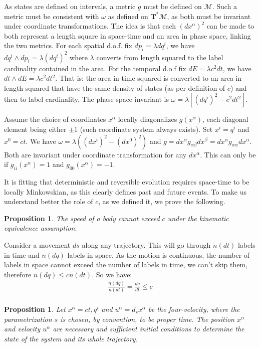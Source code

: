 \documentclass[aps,pra,10pt,twocolumn,floatfix,nofootinbib]{revtex4-1}
\newtheorem{prop}[thm]{Proposition}
\theoremstyle{definition}
\begin{document}
As states are defined on intervals, a metric $g$ must be defined on $\mathcal{M}$. Such a metric must be consistent with $\omega$ as defined on $\mathbf{T}^*\mathcal{M}$, as both must be invariant under coordinate transformations. The idea is that each $(dx^\alpha)^2$ can be made to both represent a length square in space-time and an area in phase space, linking the two metrics. For each spatial d.o.f. fix $dp_i=\lambda dq^i$, we have $dq^i \wedge dp_i = \lambda (dq^i)^2$ where $\lambda$ converts from length squared to the label cardinality contained in the area. For the temporal d.o.f fix $dE = \lambda c^2 dt$, we have $dt \wedge dE = \lambda c^2 dt^2$. That is: the area in time squared is converted to an area in length squared that have the same density of states (as per definition of $c$) and then to label cardinality. The phase space invariant is $\omega = \lambda [(dq^i)^2 - c^2 dt^2]$.

Assume the choice of coordinates $x^\alpha$ locally diagonalizes $g(x^\alpha)$, each diagonal element being either $\pm 1$ (such coordinate system always exists). Set $x^i=q^i$ and $x^0=ct$. We have $\omega = \lambda ((dx^i)^2 - (dx^0)^2)$ and $g=dx^\alpha g_{\alpha \beta} dx^\beta=dx^\alpha g_{\alpha \alpha}dx^\alpha$. Both are invariant under coordinate transformation for any $dx^\alpha$. This can only be if $g_{ii}(x^\alpha)=1$ and $g_{00}(x^\alpha)=-1$.

It is fitting that deterministic and reversible evolution requires space-time to be locally Minkowskian, as this clearly defines past and future events. To make us understand better the role of $c$, as we defined it, we prove the following.

\begin{prop}\label{locallyMinkowski}
The speed of a body cannot exceed $c$ under the kinematic equivalence assumption.
\end{prop}

Consider a movement $ds$ along any trajectory. This will go through $n(dt)$ labels in time and $n(dq)$ labels in space. As the motion is continuous, the number of labels in space cannot exceed the number of labels in time, we can't skip them, therefore $n(dq)\leq c n(dt)$. So we have:
\begin{align*}
\frac{n(dq)}{n(dt)}= \frac{dq}{dt} \leq c \\
\end{align*}

\begin{prop}\label{initialConditions}
Let $x^\alpha={ct, q^i}$ and $u^\alpha = d_s x^\alpha$ be the four-velocity, where the parametrization $s$ is chosen, by convention, to be proper time. The position $x^\alpha$ and velocity $u^\alpha$ are necessary and sufficient initial conditions to determine the state of the system and its whole trajectory.
\end{prop}
\end{document}
